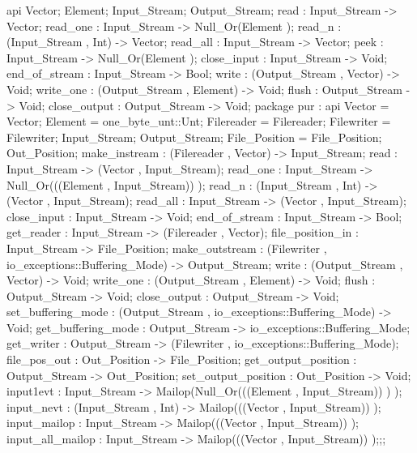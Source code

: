 api {
    Vector;
    Element;
    Input_Stream;
    Output_Stream;
    read : Input_Stream -> Vector;
    read_one : Input_Stream -> Null_Or(Element );
    read_n : (Input_Stream , Int) -> Vector;
    read_all : Input_Stream -> Vector;
    peek : Input_Stream -> Null_Or(Element );
    close_input : Input_Stream -> Void;
    end_of_stream : Input_Stream -> Bool;
    write : (Output_Stream , Vector) -> Void;
    write_one : (Output_Stream , Element) -> Void;
    flush : Output_Stream -> Void;
    close_output : Output_Stream -> Void;
        package pur
          : api {
                Vector  = Vector;
                Element  = one_byte_unt::Unt;
                Filereader  = Filereader;
                Filewriter  = Filewriter;
                Input_Stream;
                Output_Stream;
                File_Position  = File_Position;
                Out_Position;
                make_instream : (Filereader , Vector) -> Input_Stream;
                read : Input_Stream -> (Vector , Input_Stream);
                read_one : Input_Stream -> Null_Or(((Element , Input_Stream)) );
                read_n : (Input_Stream , Int) -> (Vector , Input_Stream);
                read_all : Input_Stream -> (Vector , Input_Stream);
                close_input : Input_Stream -> Void;
                end_of_stream : Input_Stream -> Bool;
                get_reader : Input_Stream -> (Filereader , Vector);
                file_position_in : Input_Stream -> File_Position;
                make_outstream : (Filewriter , io_exceptions::Buffering_Mode) -> Output_Stream;
                write : (Output_Stream , Vector) -> Void;
                write_one : (Output_Stream , Element) -> Void;
                flush : Output_Stream -> Void;
                close_output : Output_Stream -> Void;
                set_buffering_mode : (Output_Stream , io_exceptions::Buffering_Mode) -> Void;
                get_buffering_mode : Output_Stream -> io_exceptions::Buffering_Mode;
                get_writer : Output_Stream -> (Filewriter , io_exceptions::Buffering_Mode);
                file_pos_out : Out_Position -> File_Position;
                get_output_position : Output_Stream -> Out_Position;
                set_output_position : Out_Position -> Void;
                input1evt : Input_Stream -> Mailop(Null_Or(((Element , Input_Stream)) ) );
                input_nevt : (Input_Stream , Int) -> Mailop(((Vector , Input_Stream)) );
                input_mailop : Input_Stream -> Mailop(((Vector , Input_Stream)) );
                input_all_mailop : Input_Stream -> Mailop(((Vector , Input_Stream)) );};;
}
